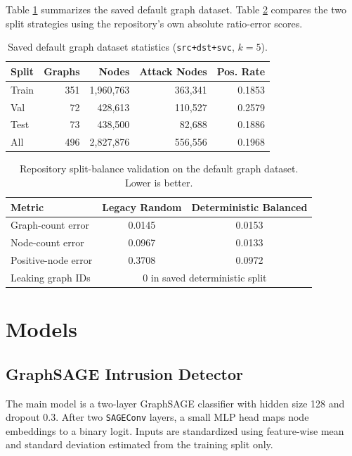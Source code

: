\documentclass[conference]{IEEEtran}
\begin{document}
Table \ref{tab:splitstats} summarizes the saved default graph dataset. Table \ref{tab:balance} compares the two split strategies using the repository's own absolute ratio-error scores.

\begin{table}[t]
\caption{Saved default graph dataset statistics (\texttt{src+dst+svc}, $k=5$).}
\label{tab:splitstats}
\centering
\begin{tabular}{|l|r|r|r|r|}
\hline
\textbf{Split} & \textbf{Graphs} & \textbf{Nodes} & \textbf{Attack Nodes} & \textbf{Pos. Rate} \\
\hline
Train & 351 & 1,960,763 & 363,341 & 0.1853 \\
Val & 72 & 428,613 & 110,527 & 0.2579 \\
Test & 73 & 438,500 & 82,688 & 0.1886 \\
\hline
All & 496 & 2,827,876 & 556,556 & 0.1968 \\
\hline
\end{tabular}
\end{table}

\begin{table}[t]
\caption{Repository split-balance validation on the default graph dataset. Lower is better.}
\label{tab:balance}
\centering
\begin{tabular}{|l|c|c|}
\hline
\textbf{Metric} & \textbf{Legacy Random} & \textbf{Deterministic Balanced} \\
\hline
Graph-count error & 0.0145 & 0.0153 \\
Node-count error & 0.0967 & 0.0133 \\
Positive-node error & 0.3708 & 0.0972 \\
Leaking graph IDs & \multicolumn{2}{c|}{0 in saved deterministic split} \\
\hline
\end{tabular}
\end{table}

\section{Models}
\subsection{GraphSAGE Intrusion Detector}
The main model is a two-layer GraphSAGE classifier with hidden size 128 and dropout 0.3. After two \texttt{SAGEConv} layers, a small MLP head maps node embeddings to a binary logit. Inputs are standardized using feature-wise mean and standard deviation estimated from the training split only.
\end{document}
